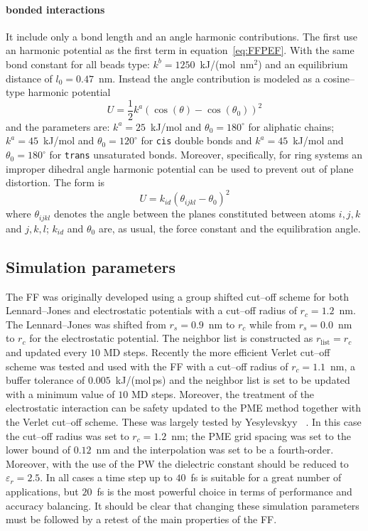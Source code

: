 \paragraph{\textbf{bonded interactions}} It include only a bond length and an angle harmonic contributions. The first use an harmonic potential as the first term in equation~\eqref{eq:FFPEF}. With the same bond constant for all beads type: $k^b = 1250$~kJ/(mol\ nm$^2$) and an equilibrium distance of $l_0 = 0.47$~nm. Instead the angle contribution is modeled as a cosine--type harmonic potential
\begin{equation*}
	U = \frac{1}{2}k^a (\cos(\theta) - \cos(\theta_0))^2
\end{equation*}
and the parameters are: $k^a = 25$~kJ/mol and $\theta_0 = 180^\circ$ for aliphatic chains; $k^a = 45$~kJ/mol and $\theta_0 = 120^\circ$ for \texttt{cis} double bonds and $k^a = 45$~kJ/mol and $\theta_0 = 180^\circ$ for \texttt{trans} unsaturated bonds. Moreover, specifically, for ring systems an improper dihedral angle harmonic potential can be used to prevent out of plane distortion. The form is
\begin{equation*}
	U = k_{id} (\theta_{ijkl} - \theta_0)^2
\end{equation*}
where $\theta_{ijkl}$ denotes the angle between the planes constituted between atoms $i,j,k$ and $j,k,l$; $k_{id}$ and $\theta_0$ are, as usual, the force constant and the equilibration angle.

\subsection{Simulation parameters}
The \martini \ac{FF} was originally developed using a group shifted cut--off scheme for both Lennard--Jones and electrostatic potentials with a cut--off radius of $r_c = 1.2$~nm. The Lennard--Jones was shifted from $r_s = 0.9$~nm to $r_c$ while from $r_s = 0.0$~nm to $r_c$ for the electrostatic potential. The neighbor list is constructed as $r_\text{list} = r_c$ and updated every $10$ \ac{MD} steps. Recently the more efficient Verlet cut--off scheme was tested and used with the \martini \ac{FF} with a cut--off radius of $r_c = 1.1$~nm, a buffer tolerance of $0.005$~kJ/(mol\,ps) and the neighbor list is set to be updated with a minimum value of $10$ \ac{MD} steps.  Moreover, the treatment of the electrostatic interaction can be safety updated to the \ac{PME} method together with the Verlet cut--off scheme. These was largely tested by Yesylevskyy \etal\, \cite{PW}. In this case the cut--off radius was set to $r_c = 1.2$~nm; the \ac{PME} grid spacing was set to the lower bound of $0.12$~nm and the interpolation was set to be a fourth-order. Moreover, with the use of the \ac{PW} the dielectric constant should be reduced to $\varepsilon_r = 2.5$. In all cases a time step up to $40$~fs is suitable for a great number of applications, but $20$~fs is the most powerful choice in terms of performance and accuracy balancing. It should be clear that changing these simulation parameters must be followed by a retest of the main properties of the \martini \ac{FF}.

